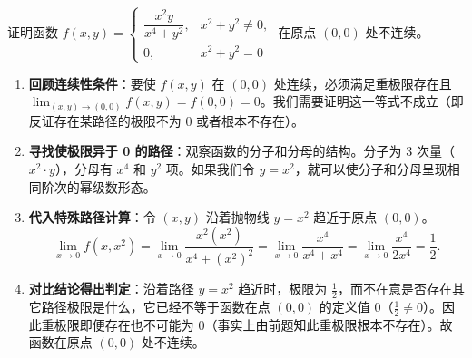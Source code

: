 \documentclass[lang=cn,11pt]{elegantbook}
\begin{document}
\begin{exercise}[连续性判定]
证明函数 $f(x,y) = \begin{cases} \dfrac{x^2y}{x^4+y^2}, & x^2+y^2\neq 0, \\ 0, & x^2+y^2=0 \end{cases}$ 在原点 $(0,0)$ 处不连续。
\end{exercise}
\begin{solution}
\begin{enumerate}
  \item \textbf{回顾连续性条件}：要使 $f(x,y)$ 在 $(0,0)$ 处连续，必须满足重极限存在且 $\displaystyle\lim_{(x,y)\to(0,0)}f(x,y) = f(0,0) = 0$。我们需要证明这一等式不成立（即反证存在某路径的极限不为 0 或者根本不存在）。
  \item \textbf{寻找使极限异于 0 的路径}：观察函数的分子和分母的结构。分子为 3 次量（$x^2 \cdot y$），分母有 $x^4$ 和 $y^2$ 项。如果我们令 $y = x^2$，就可以使分子和分母呈现相同阶次的幂级数形态。
  \item \textbf{代入特殊路径计算}：令 $(x,y)$ 沿着抛物线 $y=x^2$ 趋近于原点 $(0,0)$。
  \[
  \lim_{x\to 0} f(x,x^2) = \lim_{x\to 0} \frac{x^2(x^2)}{x^4+(x^2)^2} = \lim_{x\to 0} \frac{x^4}{x^4+x^4} = \lim_{x\to 0} \frac{x^4}{2x^4} = \frac{1}{2}.
  \]
  \item \textbf{对比结论得出判定}：沿着路径 $y=x^2$ 趋近时，极限为 $\frac{1}{2}$，而不在意是否存在其它路径极限是什么，它已经不等于函数在点 $(0,0)$ 的定义值 $0$（$\frac{1}{2} \neq 0$）。因此重极限即便存在也不可能为 0（事实上由前题知此重极限根本不存在）。故函数在原点 $(0,0)$ 处不连续。
\end{enumerate}
\end{solution}
\end{document}
